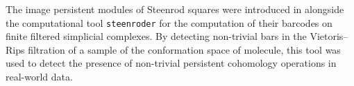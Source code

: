 \subsubsection{}

The image persistent modules of Steenrod squares were introduced in \cite{medina2022per_st} alongside the computational tool \texttt{steenroder} for the computation of their barcodes on finite filtered simplicial complexes.
By detecting non-trivial bars in the Vietoris--Rips filtration of a sample of the conformation space of molecule, this tool was used to detect the presence of non-trivial persistent cohomology operations in real-world data.

%
%
%
